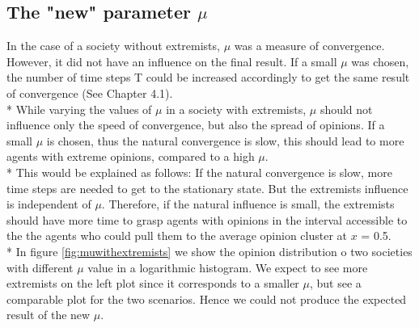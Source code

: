\documentclass[11pt]{article}
\begin{document}
\subsection{The "new" parameter \texorpdfstring{$\mu$}{TEXT}}
In the case of a society without extremists, $\mu$ was a measure of convergence. However, it did not have an influence on the final result. If a small $\mu$ was chosen, the number of time steps T could be increased accordingly to get the same result of convergence (See Chapter 4.1). \\*
While varying the values of $\mu$ in a society with extremists, $\mu$ should not influence only the speed of convergence, but also the spread of opinions. If a small $\mu$ is chosen, thus the natural convergence is slow, this should lead to more agents with extreme opinions, compared to a high $\mu$. \\*
This would be explained as follows: If the natural convergence is slow, more time steps are needed to get to the stationary state. But the extremists influence is independent of $\mu$. Therefore, if the natural influence is small, the extremists should have more time to grasp agents with opinions in the interval accessible to the the agents who could pull them to the average opinion cluster at $x$ = 0.5. \\*
In figure \ref{fig:muwithextremists} we show the opinion distribution o two societies with different $\mu$ value in a logarithmic histogram. We expect to see more extremists on the left plot since it corresponds to a smaller $\mu$, but see a comparable plot for the two scenarios. Hence we could not produce the expected result of the new $\mu$.
\end{document}
